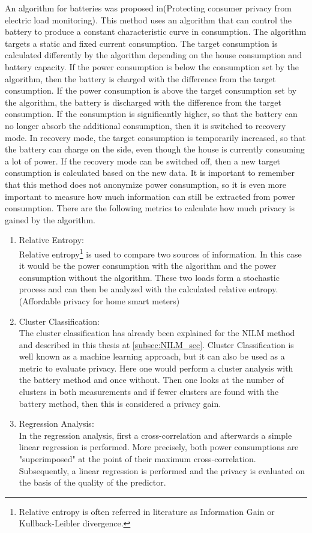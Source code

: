 An algorithm for batteries was proposed in(Protecting consumer privacy
from electric load monitoring). This method uses an algorithm that can control the battery to produce a constant characteristic curve in consumption. The algorithm targets a static and fixed current consumption. The target consumption is calculated differently by the algorithm depending on the house consumption and battery capacity. If the power consumption is below the consumption set by the algorithm, then the battery is charged with the difference from the target consumption. If the power consumption is above the target consumption set by the algorithm, the battery is discharged with the difference from the target consumption. If the consumption is significantly higher, so that the battery can no longer absorb the additional consumption, then it is switched to recovery mode. In recovery mode, the target consumption is temporarily increased, so that the battery can charge on the side, even though the house is currently consuming a lot of power. If the recovery mode can be switched off, then a new target consumption is calculated based on the new data. It is important to remember that this method does not anonymize power consumption, so it is even more important to measure how much information can still be extracted from power consumption. There are the following metrics to calculate how much privacy is gained by the algorithm.
\begin{enumerate}
\item Relative Entropy:\\
Relative entropy\footnote[2]{Relative entropy is often referred in literature as Information Gain or Kullback-Leibler divergence.} is used to compare two sources of information. In this case it would be the power consumption with the algorithm and the power consumption without the algorithm. These two loads form a stochastic process and can then be analyzed with the calculated relative entropy. (Affordable privacy for home
smart meters)
\item Cluster Classification:\\
The cluster classification has already been explained for the NILM method and described in this thesis at \ref{subsec:NILM_sec}. Cluster Classification is well known as a machine learning approach, but it can also be used as a metric to evaluate privacy. Here one would perform a cluster analysis with the battery method and once without. Then one looks at the number of clusters in both measurements and if fewer clusters are found with the battery method, then this is considered a privacy gain.
\item Regression Analysis:\\
In the regression analysis, first a cross-correlation and afterwards a simple linear regression is performed. More precisely, both power consumptions are "superimposed" at the point of their maximum cross-correlation. Subsequently, a linear regression is performed and the privacy is evaluated on the basis of the quality of the predictor.
\end{enumerate}
